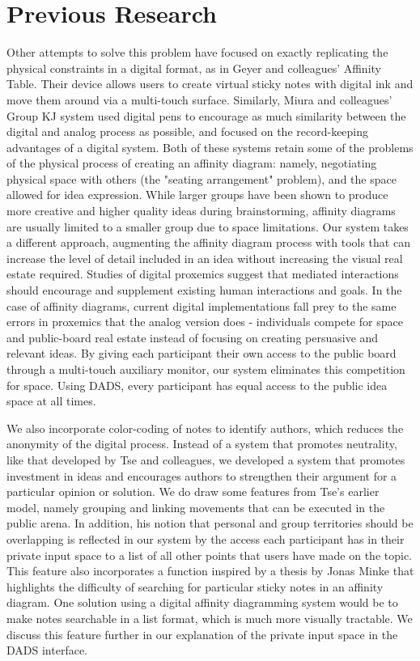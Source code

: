 \documentclass{sigchi}
\begin{document}
\section{Previous Research}
Other attempts to solve this problem have focused on exactly replicating the physical constraints in a digital format, as in Geyer and colleagues' Affinity Table\cite{Geyer:2011:DRI:2069618.2069647}. Their device allows users to create virtual sticky notes with digital ink and move them around via a multi-touch surface. Similarly, Miura and colleagues' Group KJ system used digital pens to encourage as much similarity between the digital and analog process as possible, and focused on the record-keeping advantages of a digital system\cite{miura2011gkj}. Both of these systems retain some of the problems of the physical process of creating an affinity diagram: namely, negotiating physical space with others (the "seating arrangement" problem\cite{patterson1979effects}), and the space allowed for idea expression. While larger groups have been shown to produce more creative and higher quality ideas during brainstorming\cite{gallupe1994blocking}, affinity diagrams are usually limited to a smaller group due to space limitations. Our system takes a different approach, augmenting the affinity diagram process with tools that can increase the level of detail included in an idea without increasing the visual real estate required. Studies of digital proxemics\cite{ballendat2010proxemic} suggest that mediated interactions should encourage and supplement existing human interactions and goals. In the case of affinity diagrams, current digital implementations fall prey to the same errors in proxemics that the analog version does - individuals compete for space and public-board real estate instead of focusing on creating persuasive and relevant ideas. By giving each participant their own access to the public board through a multi-touch auxiliary monitor, our system eliminates this competition for space. Using DADS, every participant has equal access to the public idea space at all times. 

We also incorporate color-coding of notes to identify authors, which reduces the anonymity of the digital process. Instead of a system that promotes neutrality, like that developed by Tse and colleagues\cite{Tse:2008:ETM:1394445.1394457}, we developed a system that promotes investment in ideas and  encourages authors to strengthen their argument for a particular opinion or solution. We do draw some features from Tse's earlier model, namely grouping and linking movements that can be executed in the public arena. In addition, his notion that personal and group territories should be overlapping is reflected in our system by the access each participant has in their private input space to a list of all other points that users have made on the topic. This feature also incorporates a function inspired by a thesis by Jonas Minke\cite{publication-4659} that highlights the difficulty of searching for particular sticky notes in an affinity diagram. One solution using a digital affinity diagramming system would be to make notes searchable in a list format, which is much more visually tractable. We discuss this feature further in our explanation of the private input space in the DADS interface.
\end{document}
